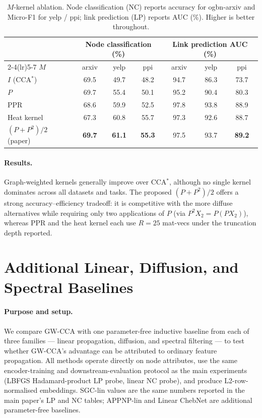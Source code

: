\documentclass{article}
\begin{document}
\begin{table}[!h]
\centering
\small
\caption{$M$-kernel ablation. Node classification (NC) reports
accuracy for ogbn-arxiv and Micro-F1 for yelp / ppi; link prediction
(LP) reports AUC (\%). Higher is better throughout.}
\label{tab:M-ablation}
\begin{tabular}{lcccccc}
\toprule
 & \multicolumn{3}{c}{Node classification (\%)}
 & \multicolumn{3}{c}{Link prediction AUC (\%)} \\
\cmidrule(lr){2-4}\cmidrule(lr){5-7}
$M$ & arxiv & yelp & ppi & arxiv & yelp & ppi \\
\midrule
$I$ (CCA$^\ast$)         & 69.5 & 49.7 & 48.2 & 94.7 & 86.3 & 73.7 \\
$P$                      & 69.7 & 55.4 & 50.1 & 95.2 & 90.4 & 80.3 \\
$\mathrm{PPR}$           & 68.6 & 59.9 & 52.5 & 97.8 & 93.8 & 88.9 \\
Heat kernel              & 67.3 & 60.8 & 55.7 & 97.3 & 92.6 & 88.7 \\
$(P + P^{2})/2$ (paper)  & \textbf{69.7} & \textbf{61.1} & \textbf{55.3}
                         & 97.5 & 93.7 & \textbf{89.2} \\
\bottomrule
\end{tabular}
\end{table}

\paragraph{Results.} Graph-weighted kernels generally improve over
CCA$^\ast$, although no single kernel dominates across all datasets
and tasks. The proposed $(P + P^{2})/2$ offers a strong
accuracy--efficiency tradeoff: it is competitive with the more
diffuse alternatives while requiring only two applications of $P$
(via $P^{2}X_2 = P(PX_2)$), whereas PPR and the heat kernel each
use $R = 25$ mat-vecs under the truncation depth reported.

\section{Additional Linear, Diffusion, and Spectral Baselines}
\label{app:extra-baselines}
\paragraph{Purpose and setup.} We compare GW-CCA with one
parameter-free inductive baseline from each of three families ---
linear propagation, diffusion, and spectral filtering --- to test
whether GW-CCA's advantage can be attributed to ordinary feature
propagation. All methods operate directly on node attributes, use the
same encoder-training and downstream-evaluation protocol as the main
experiments (LBFGS Hadamard-product LP probe, linear NC probe), and
produce L2-row-normalised embeddings. SGC-lin values are the same numbers
reported in the main paper's LP and NC tables; APPNP-lin and Linear
ChebNet are additional parameter-free baselines.
\end{document}
